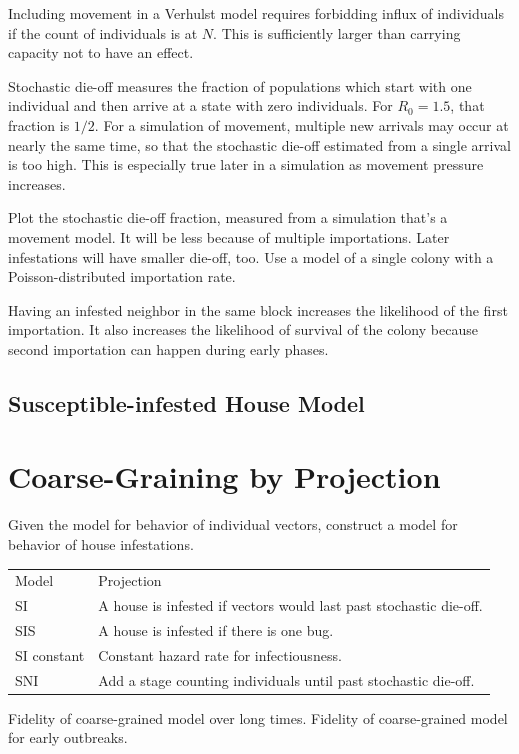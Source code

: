 \documentclass{article}
\begin{document}
Including movement in a Verhulst model requires forbidding
influx of individuals if the count of individuals is at $N$.
This is sufficiently larger than carrying capacity not to have
an effect.

Stochastic die-off measures the fraction of populations which
start with one individual and then arrive at a state with zero
individuals. For $R_0=1.5$, that fraction is $1/2$.
For a simulation of movement, multiple new arrivals may occur
at nearly the same time, so that the stochastic die-off estimated
from a single arrival is too high. This is especially true
later in a simulation as movement pressure increases.

Plot the stochastic die-off fraction, measured from
a simulation that's a movement model. It will be less because
of multiple importations. Later infestations will have
smaller die-off, too. Use a model of a single colony
with a Poisson-distributed importation rate.

Having an infested neighbor in the same block increases
the likelihood of the first importation. It also increases
the likelihood of survival of the colony because second
importation can happen during early phases.

\subsection{Susceptible-infested House Model}



\section{Coarse-Graining by Projection}
Given the model for behavior of individual vectors, construct a 
model for behavior of house infestations.

\begin{tabular}{ll}
Model & Projection \\
SI & A house is infested if vectors would last past stochastic die-off. \\
SIS & A house is infested if there is one bug. \\
SI constant & Constant hazard rate for infectiousness. \\
SNI & Add a stage counting individuals until past stochastic die-off.
\end{tabular}

Fidelity of coarse-grained model over long times.
Fidelity of coarse-grained model for early outbreaks.
\end{document}

